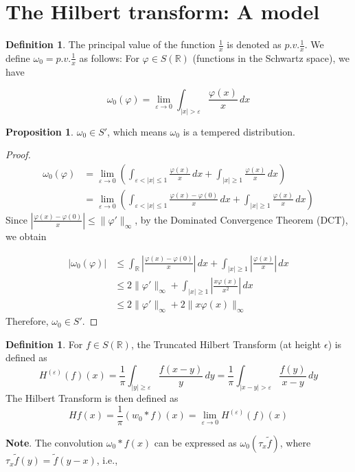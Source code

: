 \documentclass[12pt,openany]{book}
\theoremstyle{definition}
\newtheorem{definition}[theorem]{Definition}
\newtheorem{proposition}[theorem]{Proposition}
\begin{document}
\section{The Hilbert transform: A model}
\begin{definition}
    The principal value of the function $\frac{1}{x}$ is denoted as $p.v. \frac{1}{x}$. We define $\omega_0 = p.v. \frac{1}{x}$ as follows: For $\varphi \in S(\mathbb{R})$ (functions in the Schwartz space), we have

$$\omega_0(\varphi) = \lim_{\varepsilon \rightarrow 0} \int_{|x| > \varepsilon} \frac{\varphi(x)}{x} \, dx$$
\end{definition}
\begin{proposition}
     $\omega_0 \in S'$, which means $\omega_0$ is a tempered distribution.
\end{proposition}
\begin{proof}
    $$\begin{aligned}
\omega_0(\varphi) &= \lim_{\varepsilon \rightarrow 0} \left( \int_{\varepsilon < |x| \leq 1} \frac{\varphi(x)}{x} \, dx + \int_{|x| \geq 1} \frac{\varphi(x)}{x} \, dx \right) \\
&= \lim_{\varepsilon \rightarrow 0} \left( \int_{\varepsilon < |x| \leq 1} \frac{\varphi(x) - \varphi(0)}{x} \, dx + \int_{|x| \geq 1} \frac{\varphi(x)}{x} \, dx \right)
\end{aligned}$$Since $\left| \frac{\varphi(x) - \varphi(0)}{x} \right| \leq \|\varphi'\|_\infty$, by the Dominated Convergence Theorem (DCT), we obtain

$$\begin{aligned}
|\omega_0(\varphi)| &\leq \int_{\mathbb{R}} \left| \frac{\varphi(x) - \varphi(0)}{x} \right| \, dx + \int_{|x| \geq 1} \left| \frac{\varphi(x)}{x} \right| \, dx \\
&\leq 2\|\varphi'\|_\infty + \int_{|x| \geq 1} \left| \frac{x \varphi(x)}{x^2} \right| \, dx \\
&\leq 2\|\varphi'\|_\infty + 2\|x \varphi(x)\|_\infty
\end{aligned}$$Therefore, $\omega_0 \in S'$.
\end{proof}
\begin{definition}
    For $f \in S(\mathbb{R})$, the Truncated Hilbert Transform (at height $\epsilon$) is defined as
    $$H^{(\varepsilon)}(f)(x) = \frac{1}{\pi} \int_{|y| \geq \varepsilon} \frac{f(x-y)}{y} \, dy = \frac{1}{\pi} \int_{|x-y| > \varepsilon} \frac{f(y)}{x-y} \, dy$$
    The Hilbert Transform is then defined as
    $$Hf(x) = \frac{1}{\pi} (w_0 * f)(x) = \lim_{\varepsilon \rightarrow 0} H^{(\varepsilon)}(f)(x)$$
\end{definition}
\noindent\textbf{Note}. The convolution $\omega_0 * f(x)$ can be expressed as $\omega_0(\tau_x \tilde{f})$, where $\tau_x \tilde{f}(y) = \tilde{f}(y-x)$, i.e.,
\end{document}
